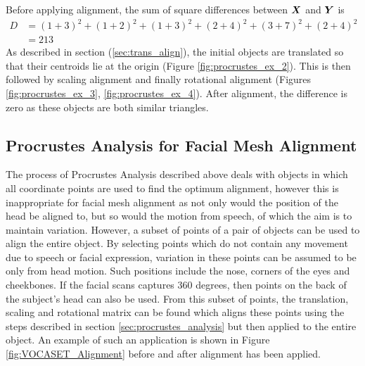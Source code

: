 Before applying alignment, the sum of square differences between ${\boldsymbol{{X}}}$ and ${\boldsymbol{{Y}}}$ is
\begin{align*}
    D& = {(1+3)^2 + (1+2)^2} + {(1+3)^2 + (2+4)^2} + {(3+7)^2 + (2+4)^2} \\
     & = 213
\end{align*}
As described in section (\ref{sec:trans_align}), the initial objects are translated so that their centroids lie at the origin (Figure \ref{fig:procrustes_ex_2}). This is then followed by scaling alignment and finally rotational alignment (Figures \ref{fig:procrustes_ex_3}, \ref{fig:procrustes_ex_4}).
After alignment, the difference is zero as these objects are both similar triangles.

\subsection{Procrustes Analysis for Facial Mesh Alignment}
The process of Procrustes Analysis described above deals with objects in which all coordinate points are used to find the optimum alignment, however this is inappropriate for facial mesh alignment as not only would the position of the head be aligned to, but so would the motion from speech, of which the aim is to maintain variation.
However, a subset of points of a pair of objects can be used to align the entire object.
By selecting points which do not contain any movement due to speech or facial expression, variation in these points can be assumed to be only from head motion.
Such positions include the nose, corners of the eyes and cheekbones.
If the facial scans captures 360 degrees, then points on the back of the subject's head can also be used.
From this subset of points, the translation, scaling and rotational matrix can be found which aligns these points using the steps described in section \ref{sec:procrustes_analysis} but then applied to the entire object.
An example of such an application is shown in Figure \ref{fig:VOCASET_Alignment} before and after alignment has been applied.

%
%
%